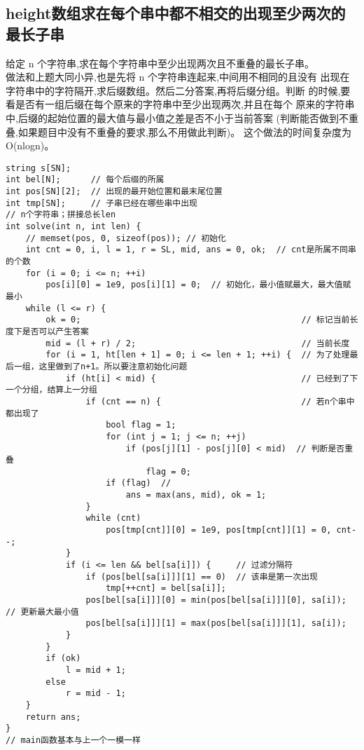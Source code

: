     \subsection{height数组求在每个串中都不相交的出现至少两次的最长子串}
        给定 n 个字符串,求在每个字符串中至少出现两次且不重叠的最长子串。\\
        做法和上题大同小异,也是先将 n 个字符串连起来,中间用不相同的且没有
        出现在字符串中的字符隔开,求后缀数组。然后二分答案,再将后缀分组。判断
        的时候,要看是否有一组后缀在每个原来的字符串中至少出现两次,并且在每个
        原来的字符串中,后缀的起始位置的最大值与最小值之差是否不小于当前答案
        (判断能否做到不重叠,如果题目中没有不重叠的要求,那么不用做此判断)。
        这个做法的时间复杂度为 O(nlogn)。
\begin{lstlisting}
string s[SN];
int bel[N];      // 每个后缀的所属
int pos[SN][2];  // 出现的最开始位置和最末尾位置
int tmp[SN];     // 子串已经在哪些串中出现
// n个字符串；拼接总长len
int solve(int n, int len) {
    // memset(pos, 0, sizeof(pos)); // 初始化
    int cnt = 0, i, l = 1, r = SL, mid, ans = 0, ok;  // cnt是所属不同串的个数
    for (i = 0; i <= n; ++i)
        pos[i][0] = 1e9, pos[i][1] = 0;  // 初始化，最小值赋最大，最大值赋最小
    while (l <= r) {
        ok = 0;                                            // 标记当前长度下是否可以产生答案
        mid = (l + r) / 2;                                 // 当前长度
        for (i = 1, ht[len + 1] = 0; i <= len + 1; ++i) {  // 为了处理最后一组，这里做到了n+1。所以要注意初始化问题
            if (ht[i] < mid) {                             // 已经到了下一个分组，结算上一分组
                if (cnt == n) {                            // 若n个串中都出现了
                    bool flag = 1;
                    for (int j = 1; j <= n; ++j)
                        if (pos[j][1] - pos[j][0] < mid)  // 判断是否重叠
                            flag = 0;
                    if (flag)  //
                        ans = max(ans, mid), ok = 1;
                }
                while (cnt)
                    pos[tmp[cnt]][0] = 1e9, pos[tmp[cnt]][1] = 0, cnt--;
            }
            if (i <= len && bel[sa[i]]) {     // 过滤分隔符
                if (pos[bel[sa[i]]][1] == 0)  // 该串是第一次出现
                    tmp[++cnt] = bel[sa[i]];
                pos[bel[sa[i]]][0] = min(pos[bel[sa[i]]][0], sa[i]);  // 更新最大最小值
                pos[bel[sa[i]]][1] = max(pos[bel[sa[i]]][1], sa[i]);
            }
        }
        if (ok)
            l = mid + 1;
        else
            r = mid - 1;
    }
    return ans;
}
// main函数基本与上一个一模一样
\end{lstlisting}